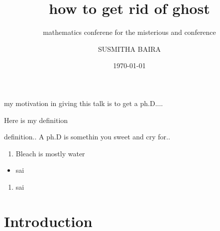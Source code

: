 \documentclass{beamer}
\title{how to get rid of ghost}
\subtitle{mathematics conferene for the misterious and conference}
\author{SUSMITHA BAIRA}
\date{\today}
\begin{document}
\begin{frame}
    \maketitle
\end{frame}
\begin{frame}
    my motivation in giving this talk is to get a ph.D....
\end{frame}
\begin{frame}[t]
    \vspace{2cm}
    Here is my definition
    \begin{block}{definition..}
    A ph.D is somethin you sweet and cry for..
    \end{block}
\end{frame}
\begin{frame}
    \begin{enumerate}
        \item Bleach is mostly water
    \end{enumerate}
    \begin{itemize}
        \item sai
    \end{itemize}
    \begin{enumerate}
        \item sai
    \end{enumerate}
\end{frame}
    
\section{Introduction}
\end{document}
